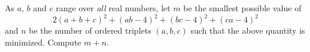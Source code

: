 As $a$, $b$ and $c$ range over \emph{all} real numbers, let $m$ be the smallest possible value of
\[
	2(a+b+c)^2+(ab-4)^2+(bc-4)^2+(ca-4)^2
\]
and $n$ be the number of ordered triplets $(a,b,c)$ such that the above quantity is minimized. Compute $m+n$.